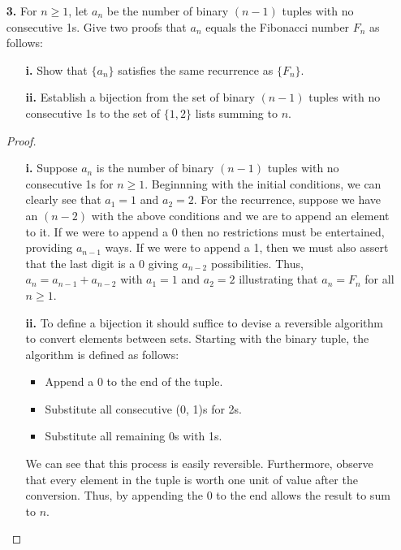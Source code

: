 \documentclass[ 12pt ]{article}
\begin{document}
\begin{enumerate}
	\item[\textbf{3.}] For $n \geq 1$, let $a_n$ be the number of binary $(n - 1)$ tuples with no consecutive 1s. Give two proofs that $a_n$ equals the Fibonacci number $F_n$ as
		follows:
		\begin{enumerate}
			\item[\textbf{i.}] Show that $\{a_n\}$ satisfies the same recurrence as $\{F_n\}$.
			\item[\textbf{ii.}] Establish a bijection from the set of binary $(n - 1)$ tuples with no consecutive 1s to the set of $\{1, 2\}$ lists summing to $n$.
		\end{enumerate}

		\begin{proof}
			\begin{enumerate}
				\item[\textbf{i.}] Suppose $a_n$ is the number of binary $(n-1)$ tuples with no consecutive 1s for $n \geq 1$. Beginnning with the initial conditions, we can clearly
					see that $a_1 = 1$ and $a_2 = 2$. For the recurrence, suppose we have an $(n-2)$ with the above conditions and we are to append an element to it. If we were to
					append a 0 then no restrictions must be entertained, providing $a_{n-1}$ ways. If we were to append a 1, then we must also assert that the last digit is a 0 giving
					$a_{n-2}$ possibilities. Thus, $a_n = a_{n-1} + a_{n-2}$ with $a_1 = 1$ and $a_2 = 2$ illustrating that $a_n = F_n$ for all $n \geq 1$.

				\item[\textbf{ii.}] To define a bijection it should suffice to devise a reversible algorithm to convert elements between sets. Starting with the binary tuple, the
					algorithm is defined as follows:
					\begin{itemize}
						\item Append a 0 to the end of the tuple.
						\item Substitute all consecutive (0, 1)s for 2s.
						\item Substitute all remaining 0s with 1s.
					\end{itemize}
					We can see that this process is easily reversible. Furthermore, observe that every element in the tuple is worth one unit of value after the conversion. Thus, by
					appending the 0 to the end allows the result to sum to $n$.
			\end{enumerate}
		\end{proof}



\end{enumerate}
\end{document}
